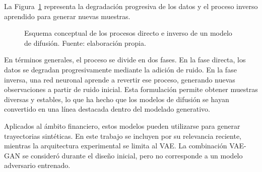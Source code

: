 La Figura~\ref{fig:difusion_conceptual_propia} representa la degradación progresiva de los datos y el proceso inverso aprendido para generar nuevas muestras.

\begin{figure}[htbp]
\centering
{}
\caption{Esquema conceptual de los procesos directo e inverso de un modelo de difusión. Fuente: elaboración propia.}
\label{fig:difusion_conceptual_propia}
\end{figure}

En términos generales, el proceso se divide en dos fases. En la fase directa, los datos se degradan progresivamente mediante la adición de ruido. En la fase inversa, una red neuronal aprende a revertir ese proceso, generando nuevas observaciones a partir de ruido inicial. Esta formulación permite obtener muestras diversas y estables, lo que ha hecho que los modelos de difusión se hayan convertido en una línea destacada dentro del modelado generativo.

Aplicados al ámbito financiero, estos modelos pueden utilizarse para generar trayectorias sintéticas. En este trabajo se incluyen por su relevancia reciente, mientras la arquitectura experimental se limita al VAE. La combinación VAE-GAN se consideró durante el diseño inicial, pero no corresponde a un modelo adversario entrenado.


